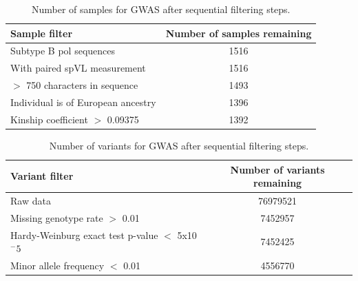 \documentclass[]{article}
\begin{document}
\begin{table}[H]
\caption{Number of samples for GWAS after sequential filtering steps.}
    \begin{tabular}{lc}
    \hline
    Sample filter & Number of samples remaining \\
    \hline
    Subtype B pol sequences & 1516 \\
    With paired spVL measurement & 1516 \\
    $>$ 750 characters in sequence & 1493 \\
    Individual is of European ancestry & 1396 \\
    Kinship coefficient $>$ 0.09375 & 1392 \\ 
    \hline
    \end{tabular}
    \label{tab:sample-filtering}
\end{table}

\begin{table}[H]
\caption{Number of variants for GWAS after sequential filtering steps.}
	\begin{tabular}{lc}
	\hline
	Variant filter & Number of variants remaining \\
	\hline 
	Raw data & 76979521 \\
	Missing genotype rate $>$ 0.01 & 7452957 \\
	Hardy-Weinburg exact test p-value $<$ 5x10$^-5$ & 7452425 \\
	Minor allele frequency $<$ 0.01 & 4556770 \\ \hline			
	\end{tabular}
	\label{tab:variant-filtering}
\end{table}
\end{document}
